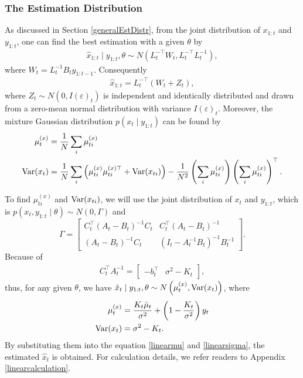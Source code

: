 \subsubsection*{The Estimation Distribution}

As discussed in Section \ref{generalEstDistr}, from the joint distribution of $x_{1:t}$ and $y_{1:t}$, one can find the best estimation with a given $\theta$ by
\begin{align*}
\hat{x}_{1:t} \mid y_{1:t},\theta \sim N\left(L_t^{-\top}W_t,L_t^{-\top}L_t^{-1}\right),
\end{align*}
where $W_t = L_t^{-1}B_{t}y_{1:t-1}$. 
Consequently 
\begin{align*}
\hat{x}_{1:t} = L_t^{-\top}(W_t+Z_t),
\end{align*}
where $Z_t \sim N\left(0, I(\varepsilon)_{t}\right)$ is independent and identically distributed and drawn from a zero-mean normal distribution with variance $ I(\varepsilon)_t$. Moreover, the mixture Gaussian distribution $p(x_t \mid y_{1:t})$ can be found by 
\begin{align}
\mu_t^{(x)} &= \frac{1}{N} \sum_i \mu_{ti}^{(x)} \label{linearmu}  \\
\mathrm{Var}(x_t) &= \frac{1}{N} \sum_i \left( \mu_{ti}^{(x)}  \mu_{ti}^{(x)\top} +\mathrm{Var}(x_{ti})\right) -\frac{1}{N^2} \left(  \sum_i  \mu_{ti}^{(x)} \right) \left( \sum_i \mu_{ti}^{(x)} \right) ^\top.\label{linearsigma} 
\end{align}


To find $\mu_{ti}^{(x)}$ and $\mathrm{Var}(x_{ti})$, we will use the joint distribution of $x_{t}$ and $y_{1:t}$, which is $p(x_{t}, y_{1:t}  \mid  \theta)\sim N(0,\Gamma)$ and 
\begin{equation*}
\Gamma=\begin{bmatrix} C_{t}^\top(A_t-B_t)^{-1}C_{t} & C_{t}^\top(A_t-B_t)^{-1}\\(A_t-B_t)^{-1}C_{t} & (I_t-A_t^{-1}B_t)^{-1}B_t^{-1} \end{bmatrix}.
\end{equation*}
Because of 
\begin{align*}
C_{t}^\top A_{t}^{-1} = \begin{bmatrix} - b_{t}^\top & \sigma^2- K_{t} \end{bmatrix},
\end{align*}
thus, for any given $\theta$, we have $\hat{x}_{t}\mid y_{1:t},\theta \sim N\left( \mu_{t}^{(x)},\mathrm{Var}(x_t) \right)$, where
\begin{align}
\mu_{t}^{(x)} &  =  \frac{K_{t}\bar{\mu}_{t}}{\sigma^2}+\left(1-\frac{K_{t}}{\sigma^2}\right)y_{t} \\
\mathrm{Var}(x_t)&= \sigma^2-K_{t}.
\end{align}
By substituting them into the equation \eqref{linearmu} and \eqref{linearsigma}, the estimated $\hat{x}_t$ is obtained. For calculation details, we refer readers to Appendix \ref{linearcalculation}.


